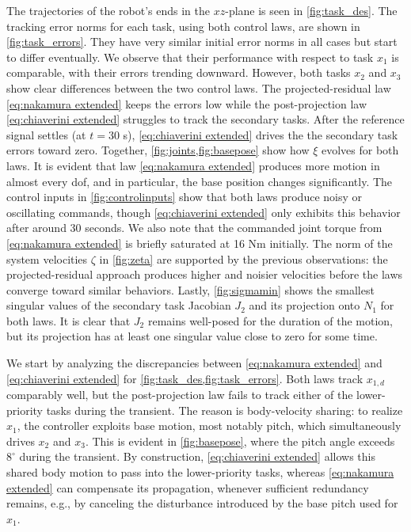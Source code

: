 \documentclass[../main.tex]{subfiles}
\begin{document}
The trajectories of the robot's ends in the \( xz \)-plane is seen in \cref{fig:task_des}. The tracking error norms for each task, using both control laws, are shown in \cref{fig:task_errors}. They have very similar initial error norms in all cases but start to differ eventually. We observe that their performance with respect to task \( x_1 \) is comparable, with their errors trending downward. However, both tasks \( x_2 \) and \( x_3 \) show clear differences between the two control laws. The projected-residual law \eqref{eq:nakamura extended} keeps the errors low while the post-projection law \eqref{eq:chiaverini extended} struggles to track the secondary tasks. After the reference signal settles (at \( t=30 \) s), \eqref{eq:chiaverini extended} drives the the secondary task errors toward zero. Together, \cref{fig:joints,fig:basepose} show how \( \xi \) evolves for both laws. It is evident that law \eqref{eq:nakamura extended} produces more motion in almost every \gls{dof}, and in particular, the base position changes significantly. The control inputs in \cref{fig:controlinputs} show that both laws produce noisy or oscillating commands, though \eqref{eq:chiaverini extended} only exhibits this behavior after around 30 seconds. We also note that the commanded joint torque from \eqref{eq:nakamura extended} is briefly saturated at 16 Nm initially. The norm of the system velocities \( \zeta \) in \cref{fig:zeta} are supported by the previous observations: the projected-residual approach produces higher and noisier velocities before the laws converge toward similar behaviors. Lastly, \cref{fig:sigmamin} shows the smallest singular values of the secondary task Jacobian \( J_2 \) and its projection onto \( N_1 \) for both laws. It is clear that \( J_2 \) remains well-posed for the duration of the motion, but its projection has at least one singular value close to zero for some time. 

We start by analyzing the discrepancies between \eqref{eq:nakamura extended} and \eqref{eq:chiaverini extended} for \cref{fig:task_des,fig:task_errors}. Both laws track \( x_{1,d} \) comparably well, but the post-projection law fails to track either of the lower-priority tasks during the transient. The reason is body-velocity sharing: to realize \(x_1\), the controller exploits base motion, most notably pitch, which simultaneously drives \(x_2\) and \(x_3\). This is evident in \cref{fig:basepose}, where the pitch angle exceeds \(8^\circ\) during the transient. By construction, \eqref{eq:chiaverini extended} allows this shared body motion to pass into the lower-priority tasks, whereas \eqref{eq:nakamura extended} can compensate its propagation, whenever sufficient redundancy remains, e.g., by canceling the disturbance introduced by the base pitch used for \(x_1\).
\end{document}
